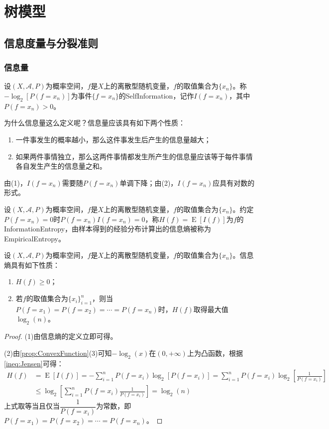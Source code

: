 \section{树模型}

\subsection{信息度量与分裂准则}
\subsubsection{信息量}
\begin{definition}
	设$(X,\mathscr{A},P)$为概率空间，$f$是$X$上的离散型随机变量，$f$的取值集合为$\{x_n\}$。称$-\log_2[P(f=x_n)]$为事件$\{f=x_n\}$的\gls{SelfInformation}，记作$I(f=x_n)$，其中$P(f=x_n)>0$。
\end{definition}
\begin{note}
	为什么信息量这么定义呢？信息量应该具有如下两个性质：
	\begin{enumerate}
		\item 一件事发生的概率越小，那么这件事发生后产生的信息量越大；
		\item 如果两件事情独立，那么这两件事情都发生所产生的信息量应该等于每件事情各自发生产生的信息量之和。
	\end{enumerate}
	由(1)，$I(f=x_n)$需要随$P(f=x_n)$单调下降；由(2)，$I(f=x_n)$应具有对数的形式。
\end{note}
\begin{definition}
	设$(X,\mathscr{A},P)$为概率空间，$f$是$X$上的离散型随机变量，$f$的取值集合为$\{x_n\}$。约定$P(f=x_n)=0$时$P(f=x_n)I(f=x_n)=0$，称$H(f)=\operatorname{E}[I(f)]$为$f$的\gls{InformationEntropy}，由样本得到的经验分布计算出的信息熵被称为\gls{EmpiricalEntropy}。
\end{definition}
\begin{property}\label{prop:InformationEntropy}
	设$(X,\mathscr{A},P)$为概率空间，$f$是$X$上的离散型随机变量，$f$的取值集合为$\{x_n\}$。信息熵具有如下性质：
	\begin{enumerate}
		\item $H(f)\geqslant0$；
		\item 若$f$的取值集合为$\{x_i\}_{i=1}^{n}$，则当$P(f=x_1)=P(f=x_2)=\cdots=P(f=x_n)$时，$H(f)$取得最大值$\log_2(n)$。
	\end{enumerate}
\end{property}
\begin{proof}
	(1)由信息熵的定义立即可得。\par
	(2)由\cref{prop:ConvexFunction}(3)可知$-\log_2(x)$在$(0,+\infty)$上为凸函数，根据\cref{ineq:Jensen}可得：
	\begin{align*}
		H(f)&=\operatorname{E}[I(f)]=-\sum_{i=1}^{n}P(f=x_i)\log_2[P(f=x_i)]=\sum_{i=1}^{n}P(f=x_i)\log_2\left[\frac{1}{P(f=x_i)}\right] \\
		&\leqslant\log_2\left[\sum_{i=1}^{n}P(f=x_i)\frac{1}{P(f=x_i)}\right]=\log_2(n)
	\end{align*}
	上式取等当且仅当$\dfrac{1}{P(f=x_i)}$为常数，即$P(f=x_1)=P(f=x_2)=\cdots=P(f=x_n)$。
\end{proof}
